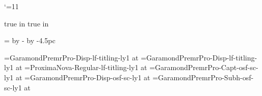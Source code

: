 \catcode`\@=11
%
%

\newdimen\textblock@odd@left
\newdimen\textblock@even@left

\def\setspinemargin#1{
  \textblock@odd@left=#1
  \textblock@even@left=\pdfpagewidth
    \advance\textblock@even@left by -\hsize
    \advance\textblock@even@left by -#1
}

\pdfhorigin=0pt
\pdfvorigin=0pt
 true in
 true in
\hsize=22pc
\vsize=39pc
\voffset=4.5pc

\setspinemargin{4.5pc}

%
%

\newif\ifclearedpage
\newif\ifdisplaypage

\def\facingpages{%
  \ifclearedpage\headline={\line{}}\footline={\line{}}\fi%
  \ifdisplaypage\headline={\line{}}\footline={\displaypagefootline}\fi%
  \global\clearedpagefalse%
  \global\displaypagefalse%
  \dimen0=\ifodd\pageno\textblock@odd@left\else\textblock@even@left\fi%
  \shipout\vbox{\moveright\dimen0\vbox{\makeheadline\pagebody\makefootline}}%
  \advancepageno%
  \ifnum\outputpenalty>-20000 \else\dosupereject\fi%
}
\output{\facingpages}

%
%


\newdimen\aheadsize \aheadsize=36pt
\newdimen\bheadsize \bheadsize=24pt
\newdimen\cheadsize \cheadsize=18pt
\newdimen\textsize \textsize=11pt
\newdimen\smalltextsize \smalltextsize=10pt
\newdimen\runningheadersize \runningheadersize=8pt

\font\booktitlefont=GaramondPremrPro-Disp-lf-titling-ly1 at \aheadsize
\font\authornamefont=GaramondPremrPro-Disp-lf-titling-ly1 at \bheadsize
\font\logofont=ProximaNova-Regular-lf-titling-ly1 at \cheadsize
\font\runningheaderfont=GaramondPremrPro-Capt-osf-sc-ly1 at \runningheadersize
\font\parttitlefont=GaramondPremrPro-Disp-osf-sc-ly1  at \aheadsize
\font\chaptertitlefont=GaramondPremrPro-Subh-osf-sc-ly1 at \cheadsize

